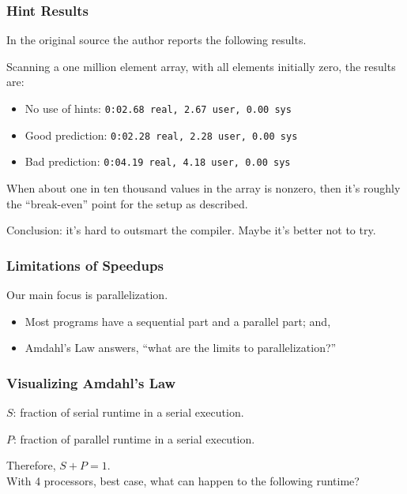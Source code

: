 \begin{frame}
\frametitle{Hint Results}

In the original source the author reports the following results.

Scanning a one million element array, with all elements initially zero, the results are:

\begin{itemize}
	\item No use of hints: \texttt{0:02.68 real,  2.67 user, 0.00 sys}
	\item Good prediction: \texttt{0:02.28 real,  2.28 user, 0.00 sys}
	\item Bad prediction: \texttt{0:04.19 real,  4.18 user, 0.00 sys}
\end{itemize}

When about one in ten thousand values in the array is nonzero, then it's roughly the ``break-even'' point for the setup as described.

Conclusion: it's hard to outsmart the compiler. Maybe it's better not to try.

\end{frame}


\begin{frame}
  \frametitle{Limitations of Speedups}

    Our main focus is parallelization.\\[1em]
  \begin{itemize}
    \item Most programs have a sequential part and a parallel part; and,\\[1em]
    \item Amdahl's Law answers, ``what are the limits to parallelization?''
  \end{itemize}

\end{frame}



\begin{frame}
\frametitle{Visualizing Amdahl's Law}

  \hspace*{2em}\begin{minipage}{.8\textwidth}
  $S$: fraction of serial runtime in a serial execution.

  $P$: fraction of parallel runtime in a serial execution.

  Therefore, $S + P = 1$.\\[2em]

  With 4 processors, best case, what can happen to the following runtime?
  \end{minipage}

  \hspace*{5em}
\end{frame}

